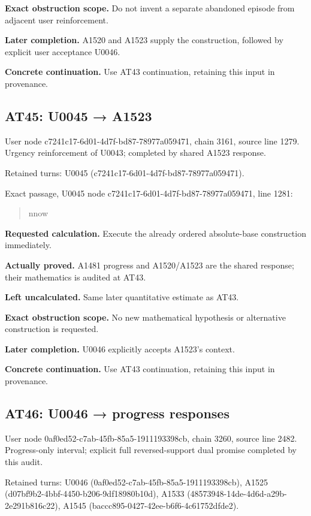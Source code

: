 \textbf{Exact obstruction scope.} Do not invent a separate abandoned
episode from adjacent user reinforcement.

\textbf{Later completion.} A1520 and A1523 supply the construction,
followed by explicit user acceptance U0046.

\textbf{Concrete continuation.} Use AT43 continuation, retaining this
input in provenance.

\subsection{AT45: U0045 → A1523}\label{at45-u0045-a1523}

User node c7241c17-6d01-4d7f-bd87-78977a059471, chain 3161, source line
1279. Urgency reinforcement of U0043; completed by shared A1523
response.

Retained turns: U0045 (c7241c17-6d01-4d7f-bd87-78977a059471).

Exact passage, U0045 node c7241c17-6d01-4d7f-bd87-78977a059471, line
1281:

\begin{quote}
nnow
\end{quote}

\textbf{Requested calculation.} Execute the already ordered
absolute-base construction immediately.

\textbf{Actually proved.} A1481 progress and A1520/A1523 are the shared
response; their mathematics is audited at AT43.

\textbf{Left uncalculated.} Same later quantitative estimate as AT43.

\textbf{Exact obstruction scope.} No new mathematical hypothesis or
alternative construction is requested.

\textbf{Later completion.} U0046 explicitly accepts A1523's context.

\textbf{Concrete continuation.} Use AT43 continuation, retaining this
input in provenance.

\subsection{AT46: U0046 → progress
responses}\label{at46-u0046-progress-responses}

User node 0af0ed52-c7ab-45fb-85a5-1911193398cb, chain 3260, source line
2482. Progress-only interval; explicit full reversed-support dual
promise completed by this audit.

Retained turns: U0046 (0af0ed52-c7ab-45fb-85a5-1911193398cb), A1525
(d07bf9b2-4bbf-4450-b206-9df18980b10d), A1533
(48573948-14de-4d6d-a29b-2e291b816c22), A1545
(baccc895-0427-42ee-b6f6-4c61752dfde2).

